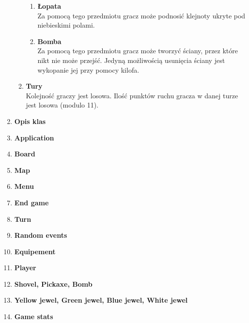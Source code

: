 \documentclass[a4paper]{article}
\begin{document}
\begin{enumerate}
\begin{enumerate}
\begin{enumerate}
								\large \item \textbf {Łopata} \\
									\normalsize											
										Za pomocą tego przedmiotu gracz może podnosić klejnoty ukryte pod niebieskimi polami. \\
								\large \item \textbf {Bomba} \\
									\normalsize
										Za pomocą tego przedmiotu gracz może tworzyć ściany, przez które nikt nie może przejść. Jedyną możliwością usunięcia ściany jest wykopanie
										jej przy pomocy kilofa. \\
							\end{enumerate}
					\Large \item \textbf {Tury} \\
						\normalsize
							Kolejność graczy jest losowa. Ilość punktów ruchu gracza w danej turze jest losowa (modulo 11).
				\end{enumerate}
		\huge \item \textbf {Opis klas} \\
			\Large \item \textbf {Application} \\
			\Large \item \textbf {Board} \\
			\Large \item \textbf {Map} \\
			\Large \item \textbf {Menu} \\
			\Large \item \textbf {End game} \\
			\Large \item \textbf {Turn} \\
			\Large \item \textbf {Random events} \\
			\Large \item \textbf {Equipement} \\
			\Large \item \textbf {Player} \\
			\Large \item \textbf {Shovel, Pickaxe, Bomb} \\
			\Large \item \textbf {Yellow jewel, Green jewel, Blue jewel, White jewel} \\
			\Large \item \textbf {Game stats} \\
	\end{enumerate}
\end{document}
